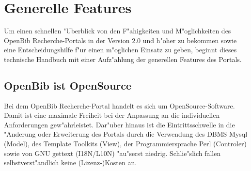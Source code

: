 \documentclass[11pt, twoside, a4paper, BCOR8mm, DIV12, bibtotoc,idxtotoc]{scrbook}
\begin{document}
\mainmatter


\chapter{Generelle Features}
Um einen schnellen "Uberblick von den F"ahigkeiten und M"oglichkeiten
des OpenBib Recherche-Portals in der Version 2.0 und h"oher zu
bekommen sowie eine Entscheidungshilfe f"ur einen m"oglichen Einsatz
zu geben, beginnt dieses technische Handbuch mit einer Aufz"ahlung der
generellen Features des Portals.

\section{OpenBib ist OpenSource}
Bei dem OpenBib Recherche-Portal handelt es sich um
OpenSource-Software. Damit ist eine maximale Freiheit bei der
Anpassung an die individuellen Anforderungen gew"ahrleistet.
Dar"uber hinaus ist die Eintrittsschwelle in die "Anderung oder
Erweiterung des Portals durch die Verwendung des DBMS Mysql (Model),
des Template Toolkits (View), der Programmiersprache Perl (Controler)
sowie von GNU gettext (I18N/L10N) "au"serst niedrig. Schlie"slich
fallen selbstverst"andlich keine (Lizenz-)Kosten an.
\end{document}
